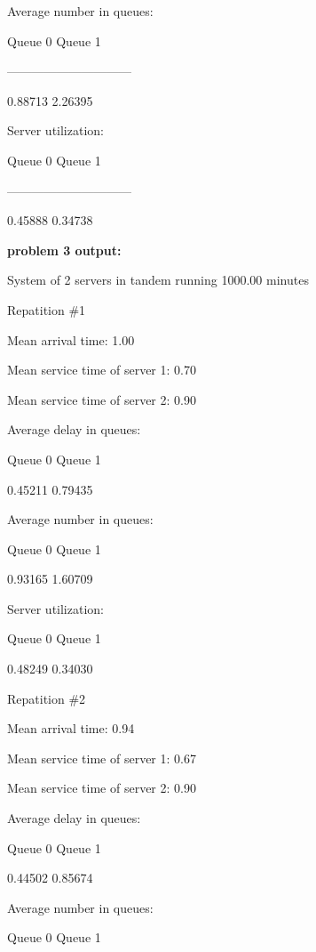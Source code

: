 \documentclass{article}
\begin{document}
 Average number in queues:
 
 Queue 0		Queue 1
 
 ------------------------------
 
 0.88713		2.26395
 


 Server utilization:
 
 Queue 0		Queue 1
 
 ------------------------------
 
 0.45888		0.34738

\newpage
 

 \textbf{problem 3 output:}

 System of 2 servers in tandem running 1000.00 minutes



 Repatition \#1

Mean arrival time: 1.00

Mean service time of server 1: 0.70

Mean service time of server 2: 0.90



Average delay in queues:

Queue 0		Queue 1		



0.45211		0.79435		



Average number in queues:

Queue 0		Queue 1		



0.93165		1.60709		



Server utilization:

Queue 0		Queue 1		



0.48249		0.34030		



 Repatition \#2

Mean arrival time: 0.94

Mean service time of server 1: 0.67

Mean service time of server 2: 0.90



Average delay in queues:

Queue 0		Queue 1		



0.44502		0.85674		



Average number in queues:

Queue 0		Queue 1		
\end{document}
